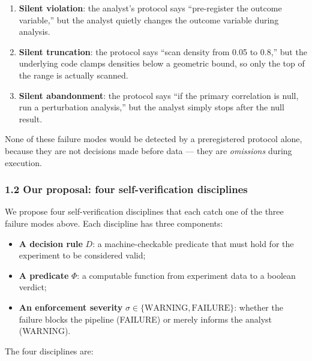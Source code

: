 \documentclass[
]{article}
\providecommand{\tightlist}{%
  \setlength{\itemsep}{0pt}\setlength{\parskip}{0pt}}
\begin{document}
\begin{enumerate}
\def\labelenumi{\arabic{enumi}.}
\tightlist
\item
  \textbf{Silent violation}: the analyst's protocol says ``pre-register
  the outcome variable,'' but the analyst quietly changes the outcome
  variable during analysis.
\item
  \textbf{Silent truncation}: the protocol says ``scan density from 0.05
  to 0.8,'' but the underlying code clamps densities below a geometric
  bound, so only the top of the range is actually scanned.
\item
  \textbf{Silent abandonment}: the protocol says ``if the primary
  correlation is null, run a perturbation analysis,'' but the analyst
  simply stops after the null result.
\end{enumerate}

None of these failure modes would be detected by a preregistered
protocol alone, because they are not decisions made before data --- they
are \emph{omissions} during execution.

\subsubsection{1.2 Our proposal: four self-verification
disciplines}\label{our-proposal-four-self-verification-disciplines}

We propose four self-verification disciplines that each catch one of the
three failure modes above. Each discipline has three components:

\begin{itemize}
\tightlist
\item
  \textbf{A decision rule} \(D\): a machine-checkable predicate that
  must hold for the experiment to be considered valid;
\item
  \textbf{A predicate} \(\Phi\): a computable function from experiment
  data to a boolean verdict;
\item
  \textbf{An enforcement severity}
  \(\sigma \in \{\text{WARNING}, \text{FAILURE}\}\): whether the failure
  blocks the pipeline (FAILURE) or merely informs the analyst (WARNING).
\end{itemize}

The four disciplines are:
\end{document}
